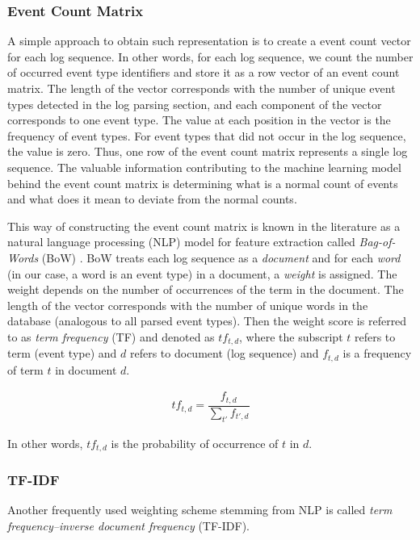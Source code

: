 \subsubsection*{Event Count Matrix}
A simple approach to obtain such representation is to create a event count vector for each log sequence. In other words, for each log sequence, we count the number of occurred event type identifiers and store it as a row vector of an event count matrix. The length of the vector corresponds with the number of unique event types detected in the log parsing section, and each component of the vector corresponds to one event type. The value at each position in the vector is the frequency of event types. For event types that did not occur in the log sequence, the value is zero. Thus, one row of the event count matrix represents a single log sequence. The valuable information contributing to the machine learning model behind the event count matrix is determining what is a normal count of events and what does it mean to deviate from the normal counts.


This way of constructing the event count matrix is known in the literature as a natural language processing (NLP) model for feature extraction called \textit{Bag-of-Words} (BoW) \cite{informationRetrieval2008}. BoW treats each log sequence as a \textit{document} and for each \textit{word} (in our case, a word is an event type) in a document, a \textit{weight} is assigned. The weight depends on the number of occurrences of the term in the document. The length of the vector corresponds with the number of unique words in the database (analogous to all parsed event types). Then the weight score is referred to as \textit{term frequency} (TF) and denoted as $tf_{t,d}$, where the subscript $t$ refers to term (event type) and $d$ refers to document (log sequence) and $f_{t,d}$ is a frequency of term $t$ in document $d$.

\begin{gather}
    tf_{t,d} = \dfrac{f_{t,d}}{\sum_{t'}f_{t', d}}
\end{gather}

In other words, $tf_{t, d}$ is the probability of occurrence of $t$ in $d$.


\subsubsection*{TF-IDF}
Another frequently used weighting scheme stemming from NLP is called \textit{term frequency–inverse document frequency} (TF-IDF). 

